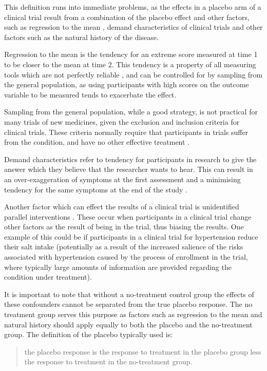 This definition runs into immediate problems, as the effects in a placebo arm of a clinical trial result from a combination of the placebo effect and other factors, such as regression to the mean \cite{Morton2003}, demand characteristics of clinical trials \cite{HrAbjartsson2001} and other factors such as the natural history of the disease.   

Regression to the mean is the tendency for an extreme score measured at time 1 to be closer to the mean at time 2. This tendency is a property of all measuring tools which are not perfectly reliable \cite{Morton2003}, and can be controlled for by sampling from the general population, as using participants with high scores on the outcome variable to be measured tends to exacerbate the effect. 

Sampling from the general population, while a good strategy, is not practical for many trials of new medicines, given the exclusion and inclusion criteria for clinical trials. These criteria normally require that participants in trials suffer from the condition, and have no other effective treatment \cite{Daugherty2008}.   

Demand characteristics \cite{Fernandez1994,weber1972subject} refer to tendency for participants in research to give the answer which they believe that the researcher wants to hear. This can result in an over-exaggeration of symptoms at the first assessment and a minimising tendency for the same symptoms at the end of the study \cite{Vase2005}.  

Another factor which can effect the results of a clinical trial is unidentified parallel interventions \cite{Ernst1995b}. These occur when participants in a clinical trial change other factors as the result of being in the trial, thus biasing the results. One example of this could be if participants in a clinical trial for hypertension reduce their salt intake (potentially as a result of the increased salience of the risks associated with hypertension caused by the process of enrollment in the trial, where typically large amounts of information are provided regarding the condition under treatment). 

It is important to note that without a no-treatment control group the effects of these confounders cannot be separated from the true placebo response.  The no treatment group serves this purpose as factors such as regression to the mean and natural history should apply equally to both the placebo and the no-treatment group.  The definition of the placebo typically used is:
\begin{quotation}
 the placebo response is the response to treatment in the placebo group less the response to treatment in the no-treatment group.  
\end{quotation}

